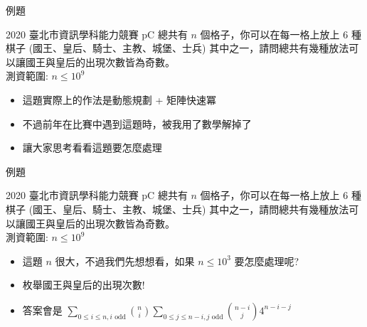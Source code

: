 \documentclass[aspectratio=169]{beamer}
\begin{document}
\begin{frame}{例題}
    \begin{block}{2020 臺北市資訊學科能力競賽 pC}
        總共有 $n$ 個格子，你可以在每一格上放上 $6$ 種棋子 (國王、皇后、騎士、主教、城堡、士兵) 其中之一，請問總共有幾種放法可以讓國王與皇后的出現次數皆為奇數。 \\
        \vspace{5mm}
        測資範圍: $n \le 10^9$
    \end{block} 
    \pause
    \begin{itemize}
        \item 這題實際上的作法是動態規劃 + 矩陣快速冪
        \item 不過前年在比賽中遇到這題時，被我用了數學解掉了
        \item 讓大家思考看看這題要怎麼處理
    \end{itemize}
\end{frame}

\begin{frame}{例題}
    \begin{block}{2020 臺北市資訊學科能力競賽 pC}
        總共有 $n$ 個格子，你可以在每一格上放上 $6$ 種棋子 (國王、皇后、騎士、主教、城堡、士兵) 其中之一，請問總共有幾種放法可以讓國王與皇后的出現次數皆為奇數。\\
        \vspace{5mm}
        測資範圍: $n \le 10^9$
    \end{block} 
    \begin{itemize}
        \item<1-> 這題 $n$ 很大，不過我們先想想看，如果 $n \le 10^3$ 要怎麼處理呢?
        \item<2-> 枚舉國王與皇后的出現次數!
        \item<3-> 答案會是 $\displaystyle \sum_{0 \le i \le n, i \text{ odd}} \binom{n}{i}\sum_{0 \le j \le n-i, j \text{ odd}} \binom{n-i}{j} 4^{n-i-j}$
    \end{itemize}
\end{frame}
\end{document}
